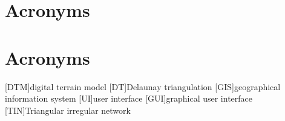 \chapter*{Acronyms}

\chapter*{Acronyms}

\begin{acronym}[UML]
  [DTM]{digital terrain model}
  [DT]{Delaunay triangulation}
  [GIS]{geographical information system}
  [UI]{user interface}
  [GUI]{graphical user interface}
  [TIN]{Triangular irregular network}
\end{acronym}
